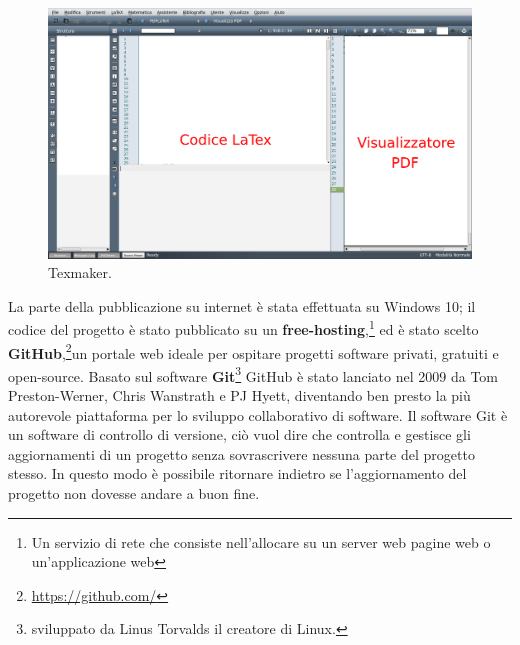 \documentclass[a4paper,11pt]{article}
\begin{document}
\begin{enumerate}
\begin{figure}[htpb]
	\centering
	\includegraphics[scale=0.30]{texmakex.png}
	\caption{Texmaker.}
	\label{fig:11}
\end{figure}
\end{enumerate}
La parte della pubblicazione su internet è stata effettuata su Windows 10; il codice del progetto è stato pubblicato su un \textbf{free-hosting},\footnote{Un servizio di rete che consiste nell'allocare su un server web pagine web o un'applicazione web} ed è stato scelto \textbf{GitHub},\footnote{\url{https://github.com/}}un portale web ideale per ospitare progetti software privati, gratuiti e open-source. 
Basato sul software \textbf{Git}\footnote{sviluppato da Linus Torvalds il creatore di Linux.} GitHub è stato lanciato nel 2009 da Tom Preston-Werner, Chris Wanstrath e PJ Hyett, diventando ben presto la più autorevole piattaforma per lo sviluppo collaborativo di software.\newline 
Il software Git è un software di controllo di versione, ciò vuol dire che controlla e gestisce gli aggiornamenti di un progetto senza sovrascrivere nessuna parte del progetto stesso. In questo modo è possibile ritornare indietro se l'aggiornamento del progetto non dovesse andare a buon fine.
\end{document}
